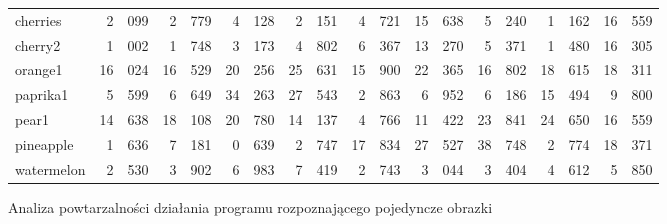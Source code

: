 \documentclass[a4paper,12pt,leqno]{article}
\begin{document}
\begin{figure}
{\begin{tabular}{|l|r@{.}lr@{.}lr@{.}lr@{.}lr@{.}lr@{.}lr@{.}lr@{.}lr@{.}l|}
cherries   &  2&099 &  2&779 &  4&128 &  2&151 &  4&721 & 15&638 &  5&240 &  1&162 & 16&559 \\
cherry2    &  1&002 &  1&748 &  3&173 &  4&802 &  6&367 & 13&270 &  5&371 &  1&480 & 16&305 \\
orange1    & 16&024 & 16&529 & 20&256 & 25&631 & 15&900 & 22&365 & 16&802 & 18&615 & 18&311 \\
paprika1   &  5&599 &  6&649 & 34&263 & 27&543 &  2&863 &  6&952 &  6&186 & 15&494 &  9&800 \\
pear1      & 14&638 & 18&108 & 20&780 & 14&137 &  4&766 & 11&422 & 23&841 & 24&650 & 16&559 \\
pineapple  &  1&636 &  7&181 &  0&639 &  2&747 & 17&834 & 27&527 & 38&748 &  2&774 & 18&371 \\
watermelon &  2&530 &  3&902 &  6&983 &  7&419 &  2&743 &  3&044 &  3&404 &  4&612 &  5&850 \\ \hline
\end{tabular}}
\normalsize\caption{Analiza powtarzalności działania programu rozpoznającego pojedyncze obrazki}\label{single-results}
\end{figure}
\end{document}
